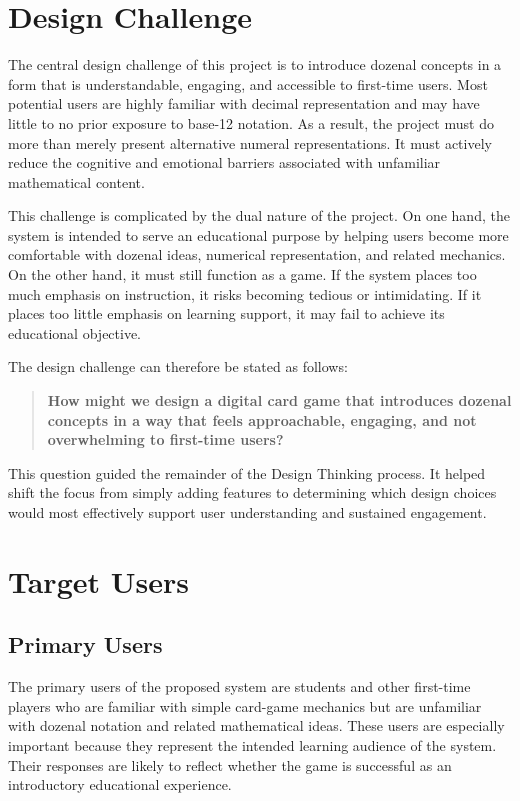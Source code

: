 \documentclass[12pt]{article}
\begin{document}
    \section{Design Challenge}

    The central design challenge of this project is to introduce dozenal concepts in a form that is understandable, engaging, and accessible to first-time users. Most potential users are highly familiar with decimal representation and may have little to no prior exposure to base-12 notation. As a result, the project must do more than merely present alternative numeral representations. It must actively reduce the cognitive and emotional barriers associated with unfamiliar mathematical content.

    This challenge is complicated by the dual nature of the project. On one hand, the system is intended to serve an educational purpose by helping users become more comfortable with dozenal ideas, numerical representation, and related mechanics. On the other hand, it must still function as a game. If the system places too much emphasis on instruction, it risks becoming tedious or intimidating. If it places too little emphasis on learning support, it may fail to achieve its educational objective.

    The design challenge can therefore be stated as follows:

    \begin{quote}
        \textbf{How might we design a digital card game that introduces dozenal concepts in a way that feels approachable, engaging, and not overwhelming to first-time users?}
    \end{quote}

    This question guided the remainder of the Design Thinking process. It helped shift the focus from simply adding features to determining which design choices would most effectively support user understanding and sustained engagement.

    \section{Target Users}

    \subsection{Primary Users}

    The primary users of the proposed system are students and other first-time players who are familiar with simple card-game mechanics but are unfamiliar with dozenal notation and related mathematical ideas. These users are especially important because they represent the intended learning audience of the system. Their responses are likely to reflect whether the game is successful as an introductory educational experience.
\end{document}
